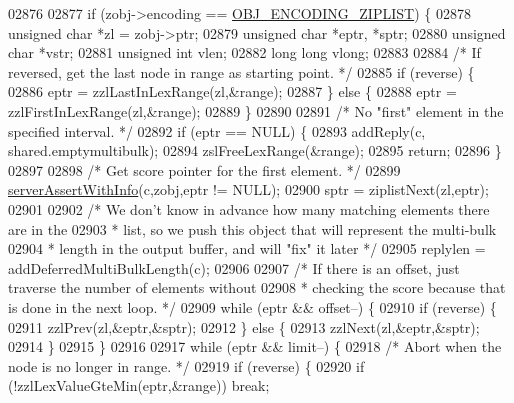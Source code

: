 \begin{DoxyCode}
02876 
02877     \textcolor{keywordflow}{if} (zobj->encoding == \hyperlink{server_8h_aabf064ede983103f1fd0df2086e84eee}{OBJ\_ENCODING\_ZIPLIST}) \{
02878         \textcolor{keywordtype}{unsigned} \textcolor{keywordtype}{char} *zl = zobj->ptr;
02879         \textcolor{keywordtype}{unsigned} \textcolor{keywordtype}{char} *eptr, *sptr;
02880         \textcolor{keywordtype}{unsigned} \textcolor{keywordtype}{char} *vstr;
02881         \textcolor{keywordtype}{unsigned} \textcolor{keywordtype}{int} vlen;
02882         \textcolor{keywordtype}{long} \textcolor{keywordtype}{long} vlong;
02883 
02884         \textcolor{comment}{/* If reversed, get the last node in range as starting point. */}
02885         \textcolor{keywordflow}{if} (reverse) \{
02886             eptr = zzlLastInLexRange(zl,&range);
02887         \} \textcolor{keywordflow}{else} \{
02888             eptr = zzlFirstInLexRange(zl,&range);
02889         \}
02890 
02891         \textcolor{comment}{/* No "first" element in the specified interval. */}
02892         \textcolor{keywordflow}{if} (eptr == NULL) \{
02893             addReply(c, shared.emptymultibulk);
02894             zslFreeLexRange(&range);
02895             \textcolor{keywordflow}{return};
02896         \}
02897 
02898         \textcolor{comment}{/* Get score pointer for the first element. */}
02899         \hyperlink{server_8h_a7308f76cbff9a8d3797fe78190b91282}{serverAssertWithInfo}(c,zobj,eptr != NULL);
02900         sptr = ziplistNext(zl,eptr);
02901 
02902         \textcolor{comment}{/* We don't know in advance how many matching elements there are in the}
02903 \textcolor{comment}{         * list, so we push this object that will represent the multi-bulk}
02904 \textcolor{comment}{         * length in the output buffer, and will "fix" it later */}
02905         replylen = addDeferredMultiBulkLength(c);
02906 
02907         \textcolor{comment}{/* If there is an offset, just traverse the number of elements without}
02908 \textcolor{comment}{         * checking the score because that is done in the next loop. */}
02909         \textcolor{keywordflow}{while} (eptr && offset--) \{
02910             \textcolor{keywordflow}{if} (reverse) \{
02911                 zzlPrev(zl,&eptr,&sptr);
02912             \} \textcolor{keywordflow}{else} \{
02913                 zzlNext(zl,&eptr,&sptr);
02914             \}
02915         \}
02916 
02917         \textcolor{keywordflow}{while} (eptr && limit--) \{
02918             \textcolor{comment}{/* Abort when the node is no longer in range. */}
02919             \textcolor{keywordflow}{if} (reverse) \{
02920                 \textcolor{keywordflow}{if} (!zzlLexValueGteMin(eptr,&range)) \textcolor{keywordflow}{break};

\end{DoxyCode}
